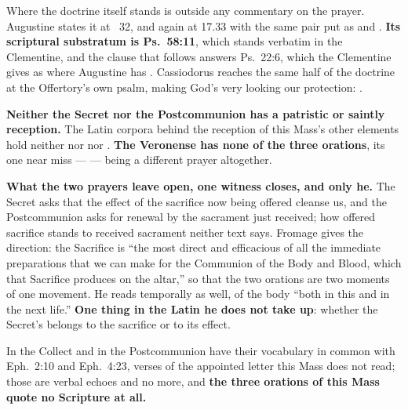 Where the doctrine itself stands is outside any commentary on the prayer.
Augustine states it at ~32, and again at  17.33 with the same pair put as  and
. \textbf{Its scriptural substratum is Ps.~58:11}, which stands
verbatim in the Clementine, and the clause that follows answers Ps.~22:6, which
the Clementine gives as  where Augustine
has . Cassiodorus reaches the same half of the
doctrine at the Offertory's own psalm, making God's very looking our protection: .

\textbf{Neither the Secret nor the Postcommunion has a patristic or saintly
reception.} The Latin corpora behind the reception of this Mass's other
elements hold neither  nor  nor . \textbf{The Veronense has none of the three
orations}, its one near miss ---  --- being a different prayer altogether.

\textbf{What the two prayers leave open, one witness closes, and only he.} The
Secret asks that the effect of the sacrifice now being offered cleanse us, and
the Postcommunion asks for renewal by the sacrament just received; how offered
sacrifice stands to received sacrament neither text says. Fromage gives the
direction: the Sacrifice is ``the most direct and efficacious of all the
immediate preparations that we can make for the Communion of the Body and Blood,
which that Sacrifice produces on the altar,'' so that the two orations are two
moments of one movement. He reads  temporally
as well, of the body ``both in this and in the next life.'' \textbf{One thing in
the Latin he does not take up}: whether the Secret's  belongs to the
sacrifice or to its effect.

In the Collect  and in the Postcommunion  have their vocabulary in common with Eph.~2:10 and
Eph.~4:23, verses of the appointed letter this Mass does not read; those are verbal echoes and no more, and
\textbf{the three orations of this Mass quote no Scripture at all.}

\clearpage
